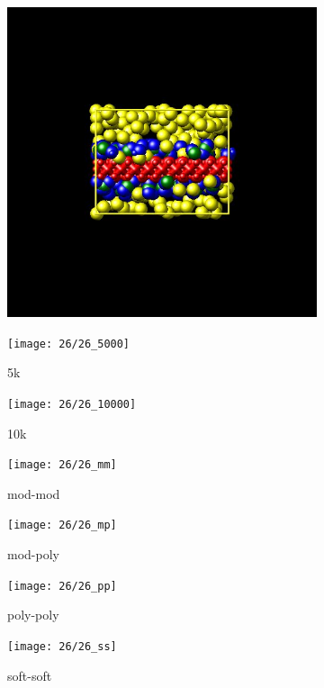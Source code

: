 \documentclass[a4paper]{article}
\begin{document}
\begin{figure}[H]
\begin{subfigure}{0.3\textwidth}
  \centering
  \includegraphics[width=\linewidth,keepaspectratio]{start}
  \caption{}
\end{subfigure}
\begin{subfigure}{0.3\textwidth}
  \centering
  \texttt{[image: 26/26\_5000]}
  \caption{5k}
\end{subfigure}
\begin{subfigure}{0.3\textwidth}
  \centering
  \texttt{[image: 26/26\_10000]}
  \caption{10k}
\end{subfigure}
\caption{}
\label{fig_1}
\end{figure}

\begin{figure}[H]
\begin{subfigure}{0.24\textwidth}
  \centering
  \texttt{[image: 26/26\_mm]}
  \caption{mod-mod}
\end{subfigure}
\begin{subfigure}{0.24\textwidth}
  \centering
  \texttt{[image: 26/26\_mp]}
  \caption{mod-poly}
\end{subfigure}
\begin{subfigure}{0.24\textwidth}
  \centering
  \texttt{[image: 26/26\_pp]}
  \caption{poly-poly}
\end{subfigure}
\begin{subfigure}{0.24\textwidth}
  \centering
  \texttt{[image: 26/26\_ss]}
  \caption{soft-soft}
\end{subfigure}
\caption{}
\label{fig_1}
\end{figure}
\end{document}
